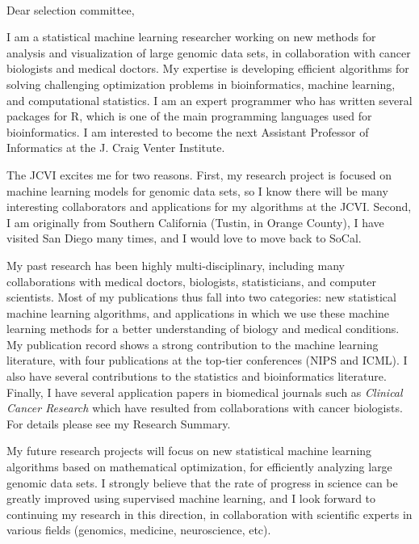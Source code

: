 \documentclass{article}
\begin{document}
\mbox{ }

Dear selection committee,

I am a statistical machine learning researcher working on new methods
for analysis and visualization of large genomic data sets, in collaboration
with cancer biologists and medical doctors. My expertise is developing
efficient algorithms for solving challenging optimization problems in
bioinformatics, machine learning, and computational statistics. I am
an expert programmer who has written several packages for R, which is
one of the main programming languages used for bioinformatics. I am
interested to become the next Assistant Professor of Informatics at
the J. Craig Venter Institute.

The JCVI excites me for two reasons. First, my research project is
focused on machine learning models for genomic data sets, so I know
there will be many interesting collaborators and applications for my
algorithms at the JCVI. Second, I am originally from Southern
California (Tustin, in Orange County), I have visited San Diego many
times, and I would love to move back to SoCal.

My past research has been highly multi-disciplinary, including many
collaborations with 
medical doctors,
biologists, 
statisticians,
and computer scientists.
Most of my
publications thus fall into two categories: new statistical machine
learning algorithms, and applications in which we use these machine
learning methods for a better understanding of 
biology and medical conditions. 
My publication record shows a strong
contribution to the machine learning literature, with four
publications at the top-tier conferences (NIPS and ICML). I also have
several contributions to the statistics 
and bioinformatics 
literature.
Finally, I have several application papers in biomedical journals such
as {\it Clinical Cancer Research} which have resulted from
collaborations with cancer biologists. For details please see my
Research Summary. 

My future research projects will focus on new statistical machine
learning algorithms based on mathematical optimization, for
efficiently analyzing large genomic data sets. I strongly believe that the
rate of progress in science can be greatly improved using supervised
machine learning, and I look forward to continuing my research in this
direction, in collaboration with scientific experts in various fields
(genomics, medicine, neuroscience, etc). 
\end{document}
